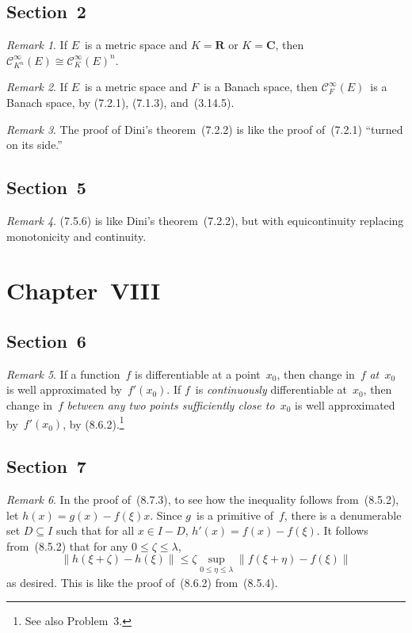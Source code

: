 \documentclass[letterpaper,12pt]{article}
\newcommand{\R}{\mathbf{R}}
\newcommand{\C}{\mathbf{C}}
\newcommand{\BC}{\mathcal{C}^{\infty}}
\newcommand{\iso}{\cong}
\newcommand{\norm}[1]{\lVert{#1}\rVert}
\theoremstyle{plain}
\theoremstyle{definition}
\theoremstyle{remark}
\newtheorem*{rmk}{Remark}
\begin{document}
\subsection*{Section~2}
\begin{rmk}
If \(E\)~is a metric space and \(K=\R\) or \(K=\C\), then \(\BC_{K^n}(E)\iso\BC_K(E)^n\).
\end{rmk}

\begin{rmk}
If \(E\)~is a metric space and \(F\)~is a Banach space, then \(\BC_F(E)\)~is a Banach space, by (7.2.1), (7.1.3), and~(3.14.5).
\end{rmk}

\begin{rmk}
The proof of Dini's theorem~(7.2.2) is like the proof of~(7.2.1) ``turned on its side.''
\end{rmk}

\subsection*{Section~5}
\begin{rmk}
(7.5.6) is like Dini's theorem~(7.2.2), but with equicontinuity replacing monotonicity and continuity.
\end{rmk}

\section*{Chapter~VIII}
\subsection*{Section~6}
\begin{rmk}
If a function~\(f\) is differentiable at a point~\(x_0\), then change in~\(f\) \emph{at~\(x_0\)} is well approximated by~\(f'(x_0)\). If \(f\)~is \emph{continuously} differentiable at~\(x_0\), then change in~\(f\) \emph{between any two points sufficiently close to~\(x_0\)} is well approximated by~\(f'(x_0)\), by (8.6.2).\footnote{See also Problem~3.}
\end{rmk}

\subsection*{Section~7}
\begin{rmk}
In the proof of~(8.7.3), to see how the inequality follows from~(8.5.2), let \(h(x)=g(x)-f(\xi)x\). Since \(g\)~is a primitive of~\(f\), there is a denumerable set \(D\subseteq I\) such that for all \(x\in I-D\), \(h'(x)=f(x)-f(\xi)\). It follows from~(8.5.2) that for any \(0\le\zeta\le\lambda\),
\[\norm{h(\xi+\zeta)-h(\xi)}\le\zeta\sup_{0\le\eta\le\lambda}\norm{f(\xi+\eta)-f(\xi)}\]
as desired. This is like the proof of~(8.6.2) from~(8.5.4).
\end{rmk}
\end{document}
